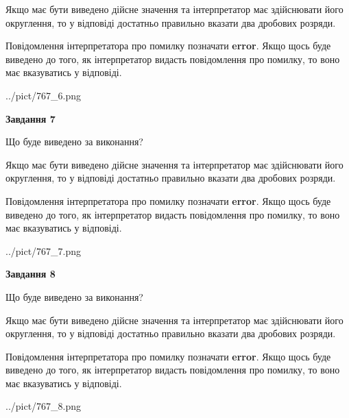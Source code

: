 \documentclass[12pt, ukrainian]{article}
\begin{document}
{\begin {Large}
Якщо має бути виведено дійсне значення та інтерпретатор має здійснювати його округлення, 
то у відповіді достатньо правильно вказати два дробових розряди.

Повідомлення інтерпретатора про помилку позначати \textbf{error}.
Якщо щось буде виведено до того, як інтерпретатор видасть повідомлення про помилку, 
то воно має вказуватись у відповіді. \par

\begin{center}
	{../pict/767_6.png}
\end{center}
\newpage

{\begin {center}\textbf{Завдання 7}\end {center}}\par
Що буде виведено за виконання? \par

Якщо має бути виведено дійсне значення та інтерпретатор має здійснювати його округлення, 
то у відповіді достатньо правильно вказати два дробових розряди.

Повідомлення інтерпретатора про помилку позначати \textbf{error}.
Якщо щось буде виведено до того, як інтерпретатор видасть повідомлення про помилку, 
то воно має вказуватись у відповіді. \par

\begin{center}
	{../pict/767_7.png}
\end{center}
\newpage

{\begin {center}\textbf{Завдання 8}\end {center}}\par
Що буде виведено за виконання? \par

Якщо має бути виведено дійсне значення та інтерпретатор має здійснювати його округлення, 
то у відповіді достатньо правильно вказати два дробових розряди.

Повідомлення інтерпретатора про помилку позначати \textbf{error}.
Якщо щось буде виведено до того, як інтерпретатор видасть повідомлення про помилку, 
то воно має вказуватись у відповіді. \par

\begin{center}
	{../pict/767_8.png}
\end{center}
\newpage


\end{Large}}
\end{document}
